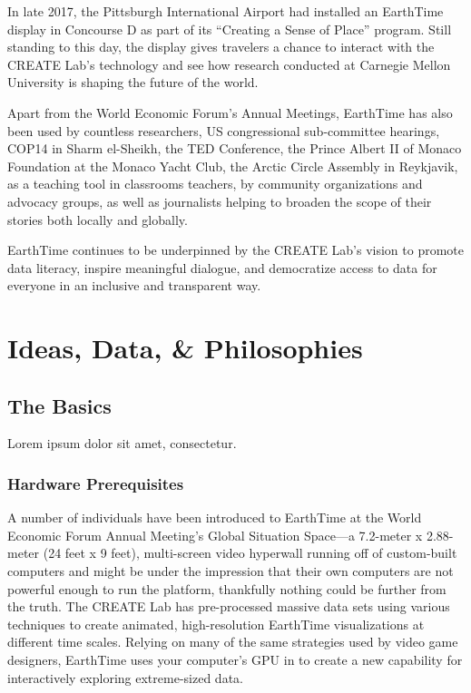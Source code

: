 \documentclass[
]{krantz}
\begin{document}
In late 2017, the Pittsburgh International Airport had installed an EarthTime display in Concourse D as part of its ``Creating a Sense of Place'' program. Still standing to this day, the display gives travelers a chance to interact with the CREATE Lab's technology and see how research conducted at Carnegie Mellon University is shaping the future of the world.

Apart from the World Economic Forum's Annual Meetings, EarthTime has also been used by countless researchers, US congressional sub-committee hearings, COP14 in Sharm el-Sheikh, the TED Conference, the Prince Albert II of Monaco Foundation at the Monaco Yacht Club, the Arctic Circle Assembly in Reykjavik, as a teaching tool in classrooms teachers, by community organizations and advocacy groups, as well as journalists helping to broaden the scope of their stories both locally and globally.

EarthTime continues to be underpinned by the CREATE Lab's vision to promote data literacy, inspire meaningful dialogue, and democratize access to data for everyone in an inclusive and transparent way.

\hypertarget{part-ideas-data-philosophies}{%
\part{Ideas, Data, \& Philosophies}\label{part-ideas-data-philosophies}}

\hypertarget{the-basics}{%
\chapter{The Basics}\label{the-basics}}

Lorem ipsum dolor sit amet, consectetur.

\hypertarget{hardware-prerequisites}{%
\section{Hardware Prerequisites}\label{hardware-prerequisites}}

A number of individuals have been introduced to EarthTime at the World Economic Forum Annual Meeting's Global Situation Space---a 7.2-meter x 2.88-meter (24 feet x 9 feet), multi-screen video hyperwall running off of custom-built computers and might be under the impression that their own computers are not powerful enough to run the platform, thankfully nothing could be further from the truth. The CREATE Lab has pre-processed massive data sets using various techniques to create animated, high-resolution EarthTime visualizations at different time scales. Relying on many of the same strategies used by video game designers, EarthTime uses your computer's GPU in to create a new capability for interactively exploring extreme-sized data.
\end{document}
